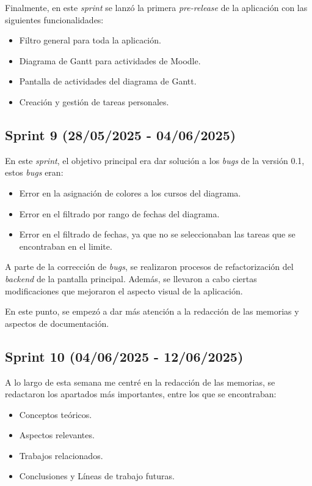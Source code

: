 Finalmente, en este \textit{sprint} se lanzó la primera \textit{pre-release} de la aplicación con las siguientes funcionalidades:
\begin{itemize}
    \item Filtro general para toda la aplicación.
    \item Diagrama de Gantt para actividades de Moodle.
    \item Pantalla de actividades del diagrama de Gantt.
    \item Creación y gestión de tareas personales.
\end{itemize}

\subsection{Sprint 9 (28/05/2025 - 04/06/2025)}
En este \textit{sprint}, el objetivo principal era dar solución a los \textit{bugs} de la versión 0.1, estos \textit{bugs} eran:
\begin{itemize}
    \item Error en la asignación de colores a los cursos del diagrama.
    \item Error en el filtrado por rango de fechas del diagrama.
    \item Error en el filtrado de fechas, ya que no se seleccionaban las tareas que se encontraban en el limite.
\end{itemize}

A parte de la corrección de \textit{bugs}, se realizaron procesos de refactorización del \textit{backend} de la pantalla principal. Además, se llevaron a cabo ciertas modificaciones que mejoraron el aspecto visual de la aplicación.

En este punto, se empezó a dar más atención a la redacción de las memorias y aspectos de documentación.

\subsection{Sprint 10 (04/06/2025 - 12/06/2025)}
A lo largo de esta semana me centré en la redacción de las memorias, se redactaron los apartados más importantes, entre los que se encontraban:
\begin{itemize}
    \item Conceptos teóricos.
    \item Aspectos relevantes.
    \item Trabajos relacionados.
    \item Conclusiones y Líneas de trabajo futuras.
\end{itemize}

